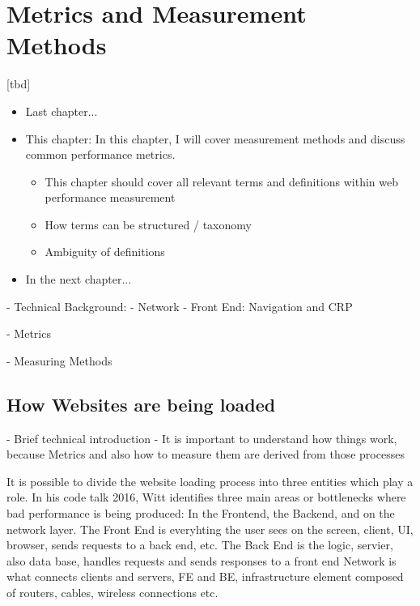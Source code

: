 \chapter{Metrics and Measurement Methods}

[tbd]

\begin{itemize}
	\item Last chapter...
	\item This chapter: In this chapter, I will cover measurement methods and discuss common performance metrics.
	\begin{itemize}
		\item This chapter should cover all relevant terms and definitions within web performance measurement
		\item How terms can be structured / taxonomy
		\item Ambiguity of definitions
	\end{itemize}
	\item In the next chapter...
\end{itemize}


- Technical Background:
	- Network
	- Front End: Navigation and CRP
	
- Metrics

- Measuring Methods







\section{How Websites are being loaded}

- Brief technical introduction
- It is important to understand how things work, because Metrics and also how to measure them are derived from those processes


It is possible to divide the website loading process into three entities which play a role.
In his code talk 2016, Witt identifies three main areas or bottlenecks where bad performance is being produced: In the Frontend, the Backend, and on the network layer.  %
The Front End is everyhting the user sees on the screen, client, UI, browser, sends requests to a back end, etc.
The Back End is the logic, servier, also data base, handles requests and sends responses to a front end
Network is what connects clients and servers, FE and BE, infrastructure element composed of routers, cables, wireless connections etc.


